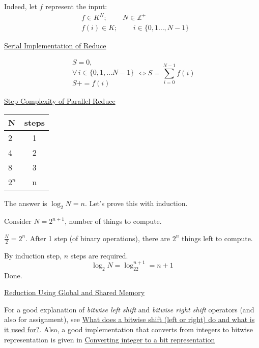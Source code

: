 \documentclass[10pt]{amsart}
\begin{document}
\begin{multicols*}{2}
Indeed, let $f$ represent the input:
\[
\begin{aligned}
  & f \in K^N ; \qquad \, N \in \mathbb{Z}^+ \\ 
  & f(i) \in K ; \qquad \, i \in \lbrace 0 ,1 \dots , N-1 \rbrace
\end{aligned}
\]

\href{https://classroom.udacity.com/courses/cs344/lessons/86719951/concepts/876789040923#}{Serial Implementation of Reduce}

\[
\begin{gathered}
  S = 0, \\ 
  \forall \, i \in \lbrace 0 , 1 , \dots N-1 \rbrace \\
  S += f(i) 
\end{gathered} \Longleftrightarrow S = \sum_{i=0}^{N-1} f(i)
\]


\href{https://classroom.udacity.com/courses/cs344/lessons/86719951/concepts/877097870923}{Step Complexity of Parallel Reduce}

\begin{tabular}{ l | c }
  N & steps \\ \hline
  2 & 1 \\
  4 & 2 \\
  8 & 3 \\
  $2^n$ & n
  \end{tabular}

The answer is $\log_2N =n$.  Let's prove this with induction.

Consider $N=2^{n+1}$, number of things to compute.

$\frac{N}{2} = 2^n$.  After 1 step (of binary operations), there are $2^n$ things left to compute.

By induction step, $n$ steps are required.
\[
\log_2N = \log_22^{n+1} = n+1
\]
Done.

\href{https://classroom.udacity.com/courses/cs344/lessons/86719951/concepts/877097880923#}{Reduction Using Global and Shared Memory}

For a good explanation of \emph{bitwise left shift} and \emph{bitwise right shift} operators (and also for assignment), see \href{http://stackoverflow.com/questions/6385792/what-does-a-bitwise-shift-left-or-right-do-and-what-is-it-used-for}{What does a bitwise shift (left or right) do and what is it used for?}.  Also, a good implementation that converts from integers to bitwise representation is given in \href{http://stackoverflow.com/questions/2686542/converting-integer-to-a-bit-representation}{Converting integer to a bit representation}


\end{multicols*}
\end{document}
